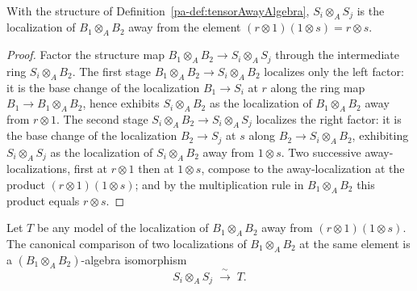\begin{theorem}
  \label{pa-thm:isLocalization_away_tensor}
  \leanok

  With the structure of Definition~\ref{pa-def:tensorAwayAlgebra}, \(S_i \otimes_A S_j\) is the
  localization of \(B_1 \otimes_A B_2\) away from the element
  \((r \otimes 1)(1 \otimes s) = r \otimes s\).
\end{theorem}
\begin{proof}
  \leanok
  Factor the structure map \(B_1 \otimes_A B_2 \to S_i \otimes_A S_j\) through the intermediate
  ring \(S_i \otimes_A B_2\). The first stage \(B_1 \otimes_A B_2 \to S_i \otimes_A B_2\)
  localizes only the left factor: it is the base change of the localization \(B_1 \to S_i\) at
  \(r\) along the ring map \(B_1 \to B_1 \otimes_A B_2\), hence exhibits \(S_i \otimes_A B_2\) as
  the localization of \(B_1 \otimes_A B_2\) away from \(r \otimes 1\). The second stage
  \(S_i \otimes_A B_2 \to S_i \otimes_A S_j\) localizes the right factor: it is the base change of
  the localization \(B_2 \to S_j\) at \(s\) along \(B_2 \to S_i \otimes_A B_2\), exhibiting
  \(S_i \otimes_A S_j\) as the localization of \(S_i \otimes_A B_2\) away from \(1 \otimes s\).
  Two successive away-localizations, first at \(r \otimes 1\) then at \(1 \otimes s\), compose
  to the away-localization at the product \((r \otimes 1)(1 \otimes s)\); and by the
  multiplication rule in \(B_1 \otimes_A B_2\) this product equals \(r \otimes s\).
\end{proof}

\begin{definition}
  \label{pa-def:tensorAwayEquiv}
  \leanok

  Let \(T\) be any model of the localization of \(B_1 \otimes_A B_2\) away from
  \((r \otimes 1)(1 \otimes s)\). The canonical comparison of two localizations of
  \(B_1 \otimes_A B_2\) at the same element is a \((B_1 \otimes_A B_2)\)-algebra isomorphism
  \[
    S_i \otimes_A S_j \;\xrightarrow{\ \sim\ }\; T .
  \]
\end{definition}

